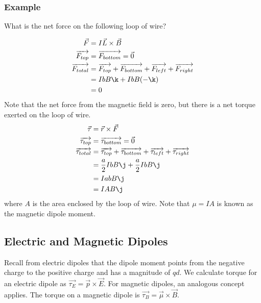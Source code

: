 \documentclass{math}
\begin{document}
\subsubsection*{Example}
What is the net force on the following loop of wire?
\begin{center}
\end{center}
\begin{align*}
  \vec{F} &= I\vec{L}\times\vec{B} \\
  \overrightarrow{F_{top}} &= \overrightarrow{F_{bottom}} = \vec{0} \\
  \overrightarrow{F_{total}} &= \overrightarrow{F_{top}}+
    \overrightarrow{F_{bottom}}+\overrightarrow{F_{left}}+
    \overrightarrow{F_{right}} \\
  &= IbB\k+IbB(-\k) \\
  &= 0
\end{align*}
Note that the net force from the magnetic field is zero, but there is a net
torque exerted on the loop of wire.
\begin{align*}
  \vec{\tau} &= \vec{r}\times\vec{F} \\
  \overrightarrow{\tau_{top}} &= \overrightarrow{\tau_{bottom}} = \vec{0} \\
  \overrightarrow{\tau_{total}} &= \overrightarrow{\tau_{top}}+
    \overrightarrow{\tau_{bottom}}+ \overrightarrow{\tau_{left}}+
    \overrightarrow{\tau_{right}} \\
  &= \frac{a}{2}IbB\j+\frac{a}{2}IbB\j \\
  &= IabB\j \\
  &= IAB\j
\end{align*}
where \( A \) is the area enclosed by the loop of wire. Note that \( \mu = IA \)
is known as the magnetic dipole moment.

\subsection*{Electric and Magnetic Dipoles}
Recall from electric dipoles that the dipole moment points from the negative
charge to the positive charge and has a magnitude of \( qd \). We calculate
torque for an electric dipole as \( \overrightarrow{\tau_E} =
\vec{p}\times\vec{E} \). For magnetic dipoles, an analogous concept applies.
The torque on a magnetic dipole is \( \overrightarrow{\tau_B} =
\vec{\mu}\times\vec{B} \).
\end{document}
